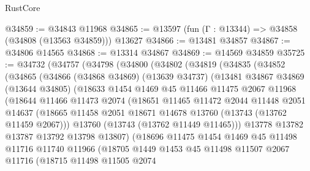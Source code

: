 \begin{lexlean}{RustCore}
\begin{coremodule}
@34859 := @34843 @11968
@34865 := @13597 (fun (Γ : @13344) => @34858 (@34808 (@13563 @34859))) @13627
@34866 := @13481 @34857
@34867 := @34806 @14565
@34868 := @13314 @34867
@34869 := @14569 @34859
@35725 := @34732
    (@34757
      (@34798
        (@34800
          (@34802
            (@34819
              (@34835
                (@34852
                  (@34865
                    (@34866
                      (@34868 @34869)
                      (@13639 @34737)
                      (@13481
                        @34867
                        @34869
                        (@13644 @34805)
                        (@18633
                          @1454
                          @1469
                          @45
                          @11466
                          @11475
                          @2067
                          @11968
                          (@18644
                            @11466
                            @11473
                            @2074
                            (@18651
                              @11465
                              @11472
                              @2044
                              @11448
                              @2051
                              @14637
                              (@18665
                                @11458
                                @2051
                                @18671
                                @14678
                                @13760
                                (@13743 (@13762 @11459 @2067)))
                              @13760
                              (@13743 (@13762 @11449 @11465)))
                            @13778
                            @13782
                            @13787
                            @13792
                            @13798
                            @13807)
                          (@18696
                            @11475
                            @1454
                            @1469
                            @45
                            @11498
                            @11716
                            @11740
                            @11966
                            (@18705
                              @1449
                              @1453
                              @45
                              @11498
                              @11507
                              @2067
                              @11716
                              (@18715
                                @11498
                                @11505
                                @2074

\end{coremodule}
\end{lexlean}
